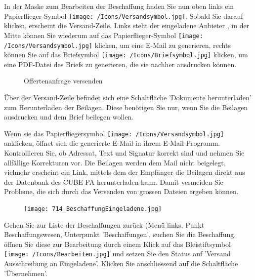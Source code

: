 In der Maske zum Bearbeiten der Beschaffung finden Sie nun oben links ein Papierflieger-Symbol \texttt{[image: /Icons/Versandsymbol.jpg]}. Sobald Sie darauf klicken, erscheint die Versand-Zeile. Links steht der eingeladene Anbieter , in der Mitte können Sie wiederum auf das Papierflieger-Symbol \texttt{[image: /Icons/Versandsymbol.jpg]}  klicken, um eine E-Mail zu generieren, rechts können Sie auf das Briefsymbol \texttt{[image: /Icons/Briefsymbol.jpg]}  klicken, um eine PDF-Datei des Briefs zu generieren, die sie nachher ausdrucken können.

\begin{figure}[H]
\caption{Offertenanfrage versenden}
\end{figure}

Über der Versand-Zeile befindet sich eine Schaltfläche 'Dokumente herunterladen'  zum Herunterladen der Beilagen. Diese benötigen Sie nur, wenn Sie die Beilagen ausdrucken und dem Brief beilegen wollen.

\vspace{\baselineskip}

Wenn sie das Papierfliegersymbol \texttt{[image: /Icons/Versandsymbol.jpg]} anklicken, öffnet sich die generierte E-Mail in ihrem E-Mail-Programm. Kontrollieren Sie, ob Adressat, Text und Signatur korrekt sind und nehmen Sie allfällige Korrekturen vor. Die Beilagen werden dem Mail nicht beigelegt, vielmehr erscheint ein Link, mittels dem der Empfänger die Beilagen direkt aus der Datenbank des CUBE PA herunterladen kann. Damit vermeiden Sie Probleme, die sich durch das Versenden von grossen Dateien ergeben können.

\begin{figure}
\vspace{-15pt}
\texttt{[image: 714\_BeschaffungEingeladene.jpg]}
\end{figure}

Gehen Sie zur Liste der Beschaffungen zurück (Menü links, Punkt Beschaffungswesen, Unterpunkt 'Beschaffungen', suchen Sie die Beschaffung, öffnen Sie diese zur Bearbeitung durch einem Klick auf das Bleistiftsymbol \texttt{[image: /Icons/Bearbeiten.jpg]}   und setzen Sie den Status auf 'Versand Ausschreibung an Eingeladene'. Klicken Sie anschliessend auf die Schaltfläche 'Übernehmen'.

\vspace{\baselineskip}

